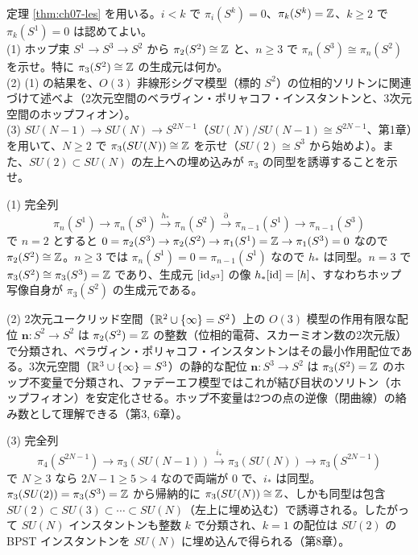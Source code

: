 \begin{problem}[難易度 B]\label{ch07-prob-les}
定理 \ref{thm:ch07-les} を用いる。$i<k$ で $\pi_i(S^k)=0$、$\pi_k(S^k)=\mathbb{Z}$、$k\ge2$ で $\pi_k(S^1)=0$ は認めてよい。\\
(1) ホップ束 $S^1\to S^3\to S^2$ から $\pi_2(S^2)\cong\mathbb{Z}$ と、$n\ge3$ で $\pi_n(S^3)\cong\pi_n(S^2)$ を示せ。特に $\pi_3(S^2)\cong\mathbb{Z}$ の生成元は何か。\\
(2) (1) の結果を、$O(3)$ 非線形シグマ模型（標的 $S^2$）の位相的ソリトンに関連づけて述べよ（2次元空間のベラヴィン・ポリャコフ・インスタントンと、3次元空間のホップフィオン）。\\
(3) $SU(N-1)\to SU(N)\to S^{2N-1}$（$SU(N)/SU(N-1)\cong S^{2N-1}$、第1章）を用いて、$N\ge2$ で $\pi_3(SU(N))\cong\mathbb{Z}$ を示せ（$SU(2)\cong S^3$ から始めよ）。また、$SU(2)\subset SU(N)$ の左上への埋め込みが $\pi_3$ の同型を誘導することを示せ。
\end{problem}

\begin{solution}
(1) 完全列
\[
\pi_n(S^1)\to\pi_n(S^3)\xrightarrow{h_*}\pi_n(S^2)\xrightarrow{\partial}\pi_{n-1}(S^1)\to\pi_{n-1}(S^3)
\]
で $n=2$ とすると $0=\pi_2(S^3)\to\pi_2(S^2)\to\pi_1(S^1)=\mathbb{Z}\to\pi_1(S^3)=0$ なので $\pi_2(S^2)\cong\mathbb{Z}$。$n\ge3$ では $\pi_n(S^1)=0=\pi_{n-1}(S^1)$ なので $h_*$ は同型。$n=3$ で $\pi_3(S^2)\cong\pi_3(S^3)=\mathbb{Z}$ であり、生成元 $[\mathrm{id}_{S^3}]$ の像 $h_*[\mathrm{id}]=[h]$、すなわちホップ写像自身が $\pi_3(S^2)$ の生成元である。

(2) 2次元ユークリッド空間（$\mathbb{R}^2\cup\{\infty\}=S^2$）上の $O(3)$ 模型の作用有限な配位 $\bm n\colon S^2\to S^2$ は $\pi_2(S^2)=\mathbb{Z}$ の整数（位相的電荷、スカーミオン数の2次元版）で分類され、ベラヴィン・ポリャコフ・インスタントンはその最小作用配位である。3次元空間（$\mathbb{R}^3\cup\{\infty\}=S^3$）の静的な配位 $\bm n\colon S^3\to S^2$ は $\pi_3(S^2)=\mathbb{Z}$ のホップ不変量で分類され、ファデーエフ模型ではこれが結び目状のソリトン（ホップフィオン）を安定化させる。ホップ不変量は2つの点の逆像（閉曲線）の絡み数として理解できる（第3, 6章）。

(3) 完全列
\[
\pi_4(S^{2N-1})\to\pi_3(SU(N-1))\xrightarrow{i_*}\pi_3(SU(N))\to\pi_3(S^{2N-1})
\]
で $N\ge3$ なら $2N-1\ge5>4$ なので両端が $0$ で、$i_*$ は同型。$\pi_3(SU(2))=\pi_3(S^3)=\mathbb{Z}$ から帰納的に $\pi_3(SU(N))\cong\mathbb{Z}$、しかも同型は包含 $SU(2)\subset SU(3)\subset\cdots\subset SU(N)$（左上に埋め込む）で誘導される。したがって $SU(N)$ インスタントンも整数 $k$ で分類され、$k=1$ の配位は $SU(2)$ の BPST インスタントンを $SU(N)$ に埋め込んで得られる（第8章）。
\end{solution}

